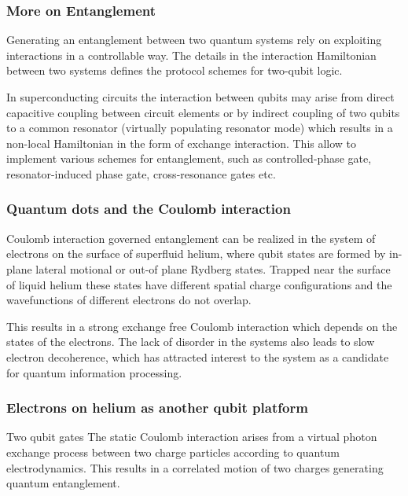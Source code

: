 \documentclass{beamer}
\begin{document}
\begin{frame}
\frametitle{More on Entanglement}

\begin{block}{}
Generating an entanglement between two quantum systems rely on
exploiting interactions in a controllable way. The details in the
interaction Hamiltonian between two systems defines the protocol
schemes for two-qubit logic.
\end{block}

\begin{block}{}
In  superconducting circuits the
interaction between qubits may arise from direct capacitive coupling
between circuit elements or by indirect coupling of two qubits to a
common resonator (virtually populating resonator mode) which results
in a non-local Hamiltonian in the form of exchange
interaction. This allow to implement various
schemes for entanglement, such as controlled-phase
gate, resonator-induced phase
gate, cross-resonance gates etc.
\end{block}
\end{frame}



\begin{frame}
\frametitle{Quantum dots and the Coulomb interaction}

\begin{block}{}
Coulomb interaction governed entanglement can be realized in
the system of electrons on the surface of superfluid helium, where
qubit states are formed by in-plane lateral motional or out-of plane
Rydberg states. Trapped near the surface of liquid helium these states
have different spatial charge configurations and the wavefunctions of
different electrons do not overlap.
\end{block}

\begin{block}{}
This results in a strong exchange
free Coulomb interaction which depends on the states of the
electrons. The lack of disorder in the systems
also leads to slow electron decoherence, which has attracted interest
to the system as a candidate for quantum information
processing.
\end{block}
\end{frame}

\begin{frame}
\frametitle{Electrons on helium as another qubit platform}


\begin{block}{Two qubit gates}
The static Coulomb interaction arises from a virtual photon exchange
 process between two charge particles according to quantum
 electrodynamics. This results in a correlated motion of two charges generating quantum entanglement. 
\end{block}
\end{frame}
\end{document}
